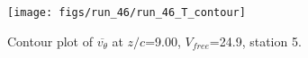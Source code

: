 \begin{figure}[H]
\centering
\texttt{[image: figs/run\_46/run\_46\_T\_contour]}
\caption{Contour plot of $\overline{v_{\theta}}$ at $z/c$=9.00, $V_{free}$=24.9, station 5.}
\label{fig:run_46_T_contour}
\end{figure}


